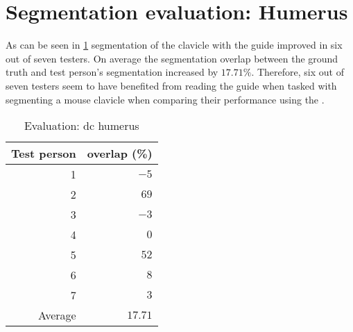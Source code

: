 \section{Segmentation evaluation: Humerus}\label{s:seg-eval-humerus}
As can be seen in \cref{tab:humerus-overlap} segmentation of the clavicle with the guide improved in six out of seven testers.
On average the segmentation overlap between the ground truth and test person's segmentation increased by $17.71\%$.
Therefore, six out of seven testers seem to have benefited from reading the guide when tasked with segmenting a mouse clavicle when comparing their performance using the .
\begin{table}[ht]
	\begin{center}
		\begin{tabular}{r r}
			\textbf{Test person} & \textbf{overlap (\%)} \\
			\hline
			1                    & $-5$                  \\
			2                    & $69$                  \\
			3                    & $-3$                  \\
			4                    & $0$                   \\
			5                    & $52$                  \\
			6                    & $8$                   \\
			7                    & $3$                   \\
			\hline
			Average              & $17.71$               \\
		\end{tabular}
		\caption{Evaluation: \acrshort{dc} humerus}\label{tab:humerus-overlap}
	\end{center}
\end{table}

